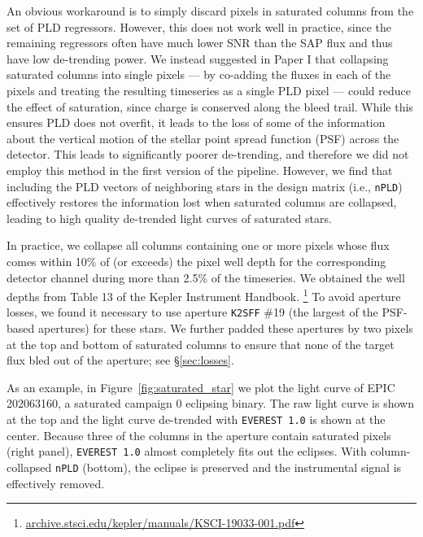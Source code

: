 \documentclass[]{emulateapj}
\begin{document}
An obvious workaround is to simply discard pixels in saturated columns from the set of PLD
regressors. However, this does not work well in practice, since the remaining regressors
often have much lower SNR than the SAP flux and thus have low de-trending power.
We instead suggested in Paper I that collapsing saturated columns into single pixels --- by co-adding
the fluxes in each of the pixels and treating the resulting timeseries as a single PLD pixel ---
could reduce the effect of saturation, since charge is conserved along the bleed trail. While
this ensures PLD does not overfit, it leads to the loss of some of the information about the
vertical motion of the stellar point spread function (PSF) across the detector. This leads to significantly poorer
de-trending, and therefore we did not employ this method in the first version of the pipeline.
However, we find that including the PLD vectors of neighboring stars in the design matrix
(i.e., \texttt{nPLD}) effectively restores the information lost when saturated columns are
collapsed, leading to high quality de-trended light curves of saturated stars.

In practice, we collapse all columns containing one or more pixels whose flux
comes within 10\% of (or exceeds)
the pixel well depth for the corresponding detector channel during more than 2.5\% of the
timeseries. We obtained the well depths from
Table 13 of the Kepler Instrument Handbook.
\footnote{\url{archive.stsci.edu/kepler/manuals/KSCI-19033-001.pdf}} To avoid aperture
losses, we found it necessary to use aperture \texttt{K2SFF} \#19 (the largest of the PSF-based
apertures) for these stars. We further padded these apertures by two pixels at the top
and bottom of saturated columns to ensure that none of the target flux bled out of the
aperture; see \S\ref{sec:losses}.

As an example, in Figure~\ref{fig:saturated_star} we plot the light curve of EPIC 202063160, a saturated
campaign 0 eclipsing binary. The raw light curve is shown at the top and the light curve
de-trended with \texttt{EVEREST 1.0} is shown at the center. Because three of the columns
in the aperture contain saturated pixels (right panel), \texttt{EVEREST 1.0} almost
completely fits out the eclipses. With column-collapsed \texttt{nPLD} (bottom), the
eclipse is preserved and the instrumental signal is effectively removed.
\end{document}
